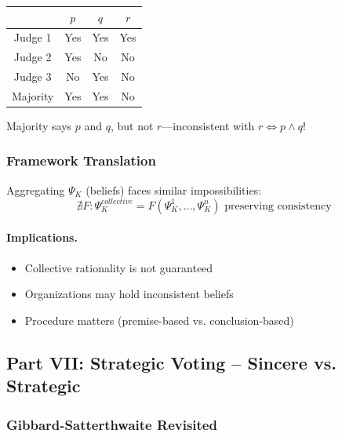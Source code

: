 \begin{center}
\begin{tabular}{|c|c|c|c|}
\hline
& $p$ & $q$ & $r$ \\
\hline
Judge 1 & Yes & Yes & Yes \\
Judge 2 & Yes & No & No \\
Judge 3 & No & Yes & No \\
\hline
Majority & Yes & Yes & No \\
\hline
\end{tabular}
\end{center}

Majority says $p$ and $q$, but not $r$---inconsistent with $r \Leftrightarrow p \land q$!

\subsubsection{Framework Translation}

Aggregating $\Psi_K$ (beliefs) faces similar impossibilities:
\begin{equation}
\nexists F: \Psi_K^{collective} = F(\Psi_K^1, \ldots, \Psi_K^n) \text{ preserving consistency}
\end{equation}

\paragraph{Implications.}
\begin{itemize}
    \item Collective rationality is not guaranteed
    \item Organizations may hold inconsistent beliefs
    \item Procedure matters (premise-based vs. conclusion-based)
\end{itemize}

\subsection{Part VII: Strategic Voting – Sincere vs. Strategic}

\subsubsection{Gibbard-Satterthwaite Revisited}


